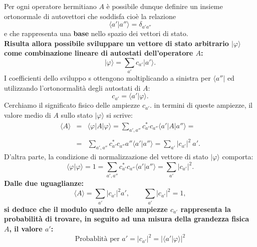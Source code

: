 \documentclass[a4paper,12pt,oneside]{book}
\begin{document}
Per ogni operatore hermitiano $A$ è possibile dunque definire un insieme ortonormale di autovettori che soddisfa cioè la relazione 
\begin{equation}
\langle a' \vert a'' \rangle = \delta _{a' a''} 
\end{equation}
e che rappresenta una \textbf{base} nello spazio dei vettori di stato.\\
\textbf{Risulta allora possibile sviluppare un vettore di stato arbitrario $\vert \varphi \rangle $ come combinazione lineare di autostati dell'operatore $A$:}
\begin{equation}
\vert \varphi \rangle = \sum _{a'} c_{a'} \vert a' \rangle .
\end{equation}
I coefficienti dello sviluppo s ottengono moltiplicando  a sinistra per $\langle a'' \vert $ ed utilizzando l'ortonormalità degli autostati di $A$:
\begin{equation}
c_{a'} = \langle a' \vert \varphi \rangle .
\end{equation}
Cerchiamo il significato fisico delle ampiezze $c_{a'}$. in termini di queste ampiezze, il valore medio di $A$ sullo stato $\vert \varphi \rangle$ si scrive:
\begin{eqnarray}
\langle A \rangle & = &  \langle \varphi \vert A \vert \varphi \rangle= \sum _{a',a''} c_{a'}^* c_{a''} \langle a' \vert A \vert a'' \rangle = \nonumber \\
\\
& = & \sum _{a',a''} c_{a'}^* c_{a''} a'' \langle a' \vert a'' \rangle = \sum _{a'} \vert c_{a'} \vert ^2\ a'. \nonumber
\end{eqnarray}
D'altra parte, la condizione di normalizzazione del vettore di stato $\vert \varphi \rangle$ comporta:
\begin{equation}
\langle \varphi \vert \varphi \rangle = 1 = \sum _{a',a''} c_{a'} ^* c_{a''}  \langle a' \vert a'' \rangle = \sum _{a'} \vert c_{a'} \vert ^2 .
\end{equation}
\textbf{Dalle due uguaglianze:}
\begin{equation}
\langle A \rangle = \sum _{a'} \vert c_{a'} \vert ^2 a', \qquad \sum _{a'} \vert c_{a'} \vert ^2 =1 , 
\end{equation}
\textbf{si deduce che il modulo quadro delle ampiezze $c_{a'}$ rappresenta la probabilità di trovare, in seguito ad una misura della grandezza fisica $A$, il valore $a'$:}
\begin{equation}
\textrm{Probablità per }a'= \vert c_{a'} \vert ^2 = \vert \langle a' \vert \varphi \rangle \vert ^2
\end{equation}
\end{document}
